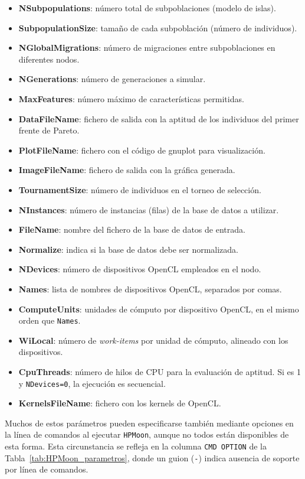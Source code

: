 \begin{itemize}
    \item \textbf{NSubpopulations}: número total de subpoblaciones (modelo de islas).
    \item \textbf{SubpopulationSize}: tamaño de cada subpoblación (número de individuos).
    \item \textbf{NGlobalMigrations}: número de migraciones entre subpoblaciones en diferentes nodos.
    \item \textbf{NGenerations}: número de generaciones a simular.
    \item \textbf{MaxFeatures}: número máximo de características permitidas.
    \item \textbf{DataFileName}: fichero de salida con la aptitud de los individuos del primer frente de Pareto.
    \item \textbf{PlotFileName}: fichero con el código de gnuplot para visualización.
    \item \textbf{ImageFileName}: fichero de salida con la gráfica generada.
    \item \textbf{TournamentSize}: número de individuos en el torneo de selección.
    \item \textbf{NInstances}: número de instancias (filas) de la base de datos a utilizar.
    \item \textbf{FileName}: nombre del fichero de la base de datos de entrada.
    \item \textbf{Normalize}: indica si la base de datos debe ser normalizada.
    \item \textbf{NDevices}: número de dispositivos OpenCL empleados en el nodo.
    \item \textbf{Names}: lista de nombres de dispositivos OpenCL, separados por comas.
    \item \textbf{ComputeUnits}: unidades de cómputo por dispositivo OpenCL, en el mismo orden que \texttt{Names}.
    \item \textbf{WiLocal}: número de \textit{work-items} por unidad de cómputo, alineado con los dispositivos.
    \item \textbf{CpuThreads}: número de hilos de CPU para la evaluación de aptitud. Si es 1 y \texttt{NDevices=0}, la ejecución es secuencial.
    \item \textbf{KernelsFileName}: fichero con los kernels de OpenCL.
\end{itemize}

Muchos de estos parámetros pueden especificarse también mediante opciones en la línea de comandos al ejecutar \texttt{HPMoon}, aunque no todos están disponibles de esta forma. Esta circunstancia se refleja en la columna \texttt{CMD OPTION} de la Tabla~\ref{tab:HPMoon_parametros}, donde un guion (\texttt{-}) indica ausencia de soporte por línea de comandos.

